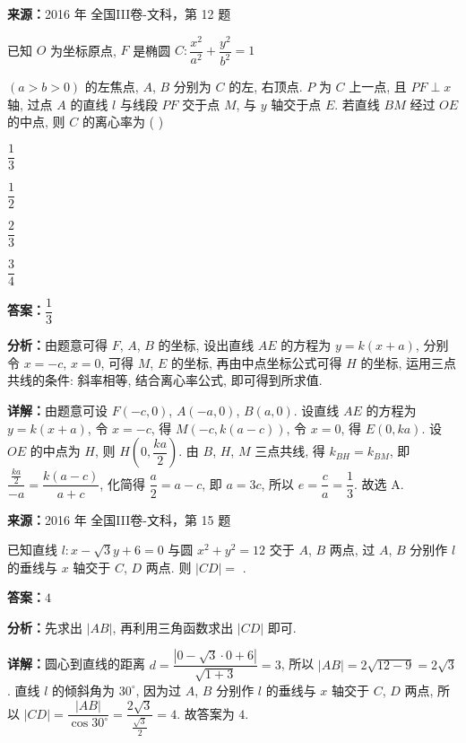 \begin{question}[points=5]
\textbf{来源：}2016 年 全国III卷-文科，第 12 题\par
已知 $O$ 为坐标原点, $F$ 是椭圆 $C:\dfrac{x^2}{a^2}+\dfrac{y^2}{b^2}=1$

$(a>b>0)$ 的左焦点, $A$, $B$ 分别为 $C$ 的左, 右顶点. $P$ 为 $C$ 上一点, 且 $PF\perp x$ 轴, 过点 $A$ 的直线 $l$ 与线段 $PF$ 交于点 $M$, 与 $y$ 轴交于点 $E$. 若直线 $BM$ 经过 $OE$ 的中点, 则 $C$ 的离心率为 ( )
\begin{choices}
  \item $\dfrac{1}{3}$
  \item $\dfrac{1}{2}$
  \item $\dfrac{2}{3}$
  \item $\dfrac{3}{4}$
\end{choices}
\begin{solution}
\textbf{答案：}$\dfrac{1}{3}$

\textbf{分析：}由题意可得 $F$, $A$, $B$ 的坐标, 设出直线 $AE$ 的方程为 $y=k(x+a)$, 分别令 $x=-c$, $x=0$, 可得 $M$, $E$ 的坐标, 再由中点坐标公式可得 $H$ 的坐标, 运用三点共线的条件: 斜率相等, 结合离心率公式, 即可得到所求值.

\textbf{详解：}由题意可设 $F(-c,0)$, $A(-a,0)$, $B(a,0)$. 设直线 $AE$ 的方程为 $y=k(x+a)$, 令 $x=-c$, 得 $M(-c,k(a-c))$, 令 $x=0$, 得 $E(0,ka)$. 设 $OE$ 的中点为 $H$, 则 $H(0,\dfrac{ka}{2})$. 由 $B$, $H$, $M$ 三点共线, 得 $k_{BH}=k_{BM}$, 即 $\dfrac{\frac{ka}{2}}{-a}=\dfrac{k(a-c)}{a+c}$, 化简得 $\dfrac{a}{2}=a-c$, 即 $a=3c$, 所以 $e=\dfrac{c}{a}=\dfrac{1}{3}$. 故选 A.
\end{solution}
\end{question}

\begin{question}[points=5]
\textbf{来源：}2016 年 全国III卷-文科，第 15 题\par
已知直线 $l:x-\sqrt{3}y+6=0$ 与圆 $x^2+y^2=12$ 交于 $A$, $B$ 两点, 过 $A$, $B$ 分别作 $l$ 的垂线与 $x$ 轴交于 $C$, $D$ 两点. 则 $|CD|=$ .
\fillin[{$4$}]
\begin{solution}
\textbf{答案：}$4$

\textbf{分析：}先求出 $|AB|$, 再利用三角函数求出 $|CD|$ 即可.

\textbf{详解：}圆心到直线的距离 $d=\dfrac{|0-\sqrt{3}\cdot0+6|}{\sqrt{1+3}}=3$, 所以 $|AB|=2\sqrt{12-9}=2\sqrt{3}$. 直线 $l$ 的倾斜角为 $30^{\circ}$, 因为过 $A$, $B$ 分别作 $l$ 的垂线与 $x$ 轴交于 $C$, $D$ 两点, 所以 $|CD|=\dfrac{|AB|}{\cos30^{\circ}}=\dfrac{2\sqrt{3}}{\frac{\sqrt{3}}{2}}=4$. 故答案为 $4$.
\end{solution}
\end{question}

